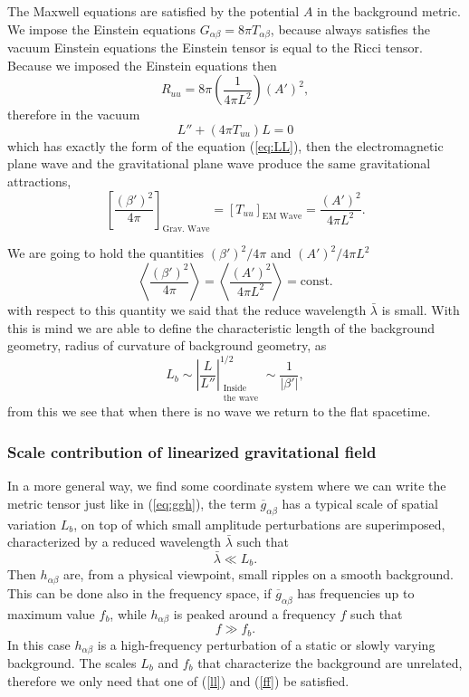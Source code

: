 The Maxwell equations are satisfied by the potential $A$ in the background
metric. We impose the Einstein equations $G_{\alpha\beta}=8\pi T_{\alpha\beta}$,
because always satisfies the vacuum Einstein equations the Einstein
tensor is equal to the Ricci tensor. Because we imposed the Einstein
equations then
\[
R_{uu}=8\pi\left(\frac{1}{4\pi L^{2}}\right)\left(A'\right)^{2},
\]
therefore in the vacuum
\[
L''+\left(4\pi T_{uu}\right)L=0
\]
which has exactly the form of the equation (\ref{eq:LL}), then the
electromagnetic plane wave and the gravitational plane wave produce
the same gravitational attractions, 
\[
\left[\frac{\left(\beta'\right)^{2}}{4\pi}\right]_{\text{Grav. Wave}}=\left[T_{uu}\right]_{\text{EM Wave}}=\frac{\left(A'\right)^{2}}{4\pi L^{2}}.
\]

We are going to hold the quantities $\left(\beta'\right)^{2}/4\pi$
and $\left(A'\right)^{2}/4\pi L^{2}$
\[
\left\langle \frac{\left(\beta'\right)^{2}}{4\pi}\right\rangle =\left\langle \frac{\left(A'\right)^{2}}{4\pi L^{2}}\right\rangle =\text{const.}
\]
with respect to this quantity we said that the reduce wavelength $\bar{\lambda}$
is small. With this is mind we are able to define the characteristic
length of the background geometry, radius of curvature of background
geometry, as 
\[
L_{b}\sim\left|\frac{L}{L''}\right|_{\begin{array}{l}
\text{Inside}\\
\text{the wave}
\end{array}}^{1/2}\sim\frac{1}{\left|\beta'\right|},
\]
from this we see that when there is no wave we return to the flat
spacetime.

\subsubsection*{Scale contribution of linearized gravitational field}

In a more general way, we find some coordinate system where we can
write the metric tensor just like in (\ref{eq:ggh}), the term $\overline{g}_{\alpha\beta}$
has a typical scale of spatial variation $L_{b}$, on top of which
small amplitude perturbations are superimposed, characterized by a
reduced wavelength $\bar{\lambda}$ such that
\begin{equation}
\bar{\lambda}\ll L_{b}.\label{ll}
\end{equation}
Then $h_{\alpha\beta}$ are, from a physical viewpoint, small ripples
on a smooth background. This can be done also in the frequency space,
if $\overline{g}_{\alpha\beta}$ has frequencies up to maximum value
$f_{b}$, while $h_{\alpha\beta}$ is peaked around a frequency $f$
such that
\begin{equation}
f\gg f_{b}.\label{ff}
\end{equation}
In this case $h_{\alpha\beta}$ is a high-frequency perturbation of
a static or slowly varying background. The scales $L_{b}$ and $f_{b}$
that characterize the background are unrelated, therefore we only
need that one of (\ref{ll}) and (\ref{ff}) be satisfied.

